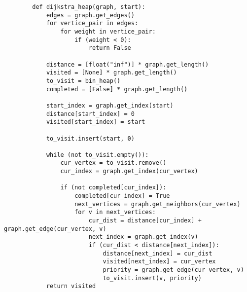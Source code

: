     \begin{lstlisting}
        def dijkstra_heap(graph, start):
            edges = graph.get_edges()
            for vertice_pair in edges:
                for weight in vertice_pair:
                    if (weight < 0):
                        return False
                    
            distance = [float("inf")] * graph.get_length()
            visited = [None] * graph.get_length()
            to_visit = bin_heap()
            completed = [False] * graph.get_length()

            start_index = graph.get_index(start)
            distance[start_index] = 0
            visited[start_index] = start
            
            to_visit.insert(start, 0)
    
            while (not to_visit.empty()):
                cur_vertex = to_visit.remove()
                cur_index = graph.get_index(cur_vertex)
                
                if (not completed[cur_index]):
                    completed[cur_index] = True
                    next_vertices = graph.get_neighbors(cur_vertex)
                    for v in next_vertices:
                        cur_dist = distance[cur_index] + graph.get_edge(cur_vertex, v)
                        next_index = graph.get_index(v)
                        if (cur_dist < distance[next_index]):
                            distance[next_index] = cur_dist
                            visited[next_index] = cur_vertex
                            priority = graph.get_edge(cur_vertex, v)
                            to_visit.insert(v, priority)
            return visited
    \end{lstlisting}


